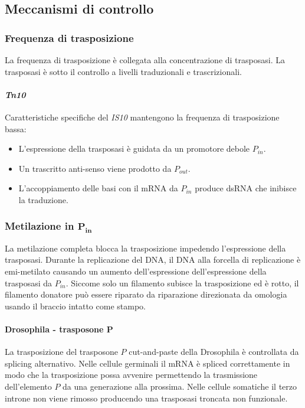 	\subsection{Meccanismi di controllo}

		\subsubsection{Frequenza di trasposizione}
		La frequenza di trasposizione \`e collegata alla concentrazione di trasposasi.
		La trasposasi \`e sotto il controllo a livelli traduzionali e trascrizionali.

			\paragraph{\emph{Tn10}}
			Caratteristiche specifiche del \emph{IS10} mantengono la frequenza di trasposizione bassa:
			\begin{itemize}
				\item L'espressione della trasposasi \`e guidata da un promotore debole $P_{in}$.
				\item Un trascritto anti-senso viene prodotto da $P_{out}$.
				\item L'accoppiamento delle basi con il mRNA da $P_{in}$ produce dsRNA che inibisce la traduzione.
			\end{itemize}

		\subsubsection{Metilazione in $\mathbf{P_{in}}$}
		La metilazione completa blocca la trasposizione impedendo l'espressione della trasposasi.
		Durante la replicazione del DNA, il DNA alla forcella di replicazione \`e emi-metilato causando un aumento dell'espressione dell'espressione della trasposasi da $P_{in}$.
		Siccome solo un filamento subisce la trasposizione ed \`e rotto, il filamento donatore pu\`o essere riparato da riparazione direzionata da omologia usando il braccio intatto come stampo.

			\paragraph{Drosophila - trasposone $\mathbf{P}$}
			La trasposizione del trasposone $P$ cut-and-paste della Drosophila \`e controllata da splicing alternativo.
			Nelle cellule germinali il mRNA \`e spliced correttamente in modo che la trasposizione possa avvenire permettendo la trasmissione dell'elemento $P$ da una generazione alla prossima.
			Nelle cellule somatiche il terzo introne non viene rimosso producendo una trasposasi troncata non funzionale.

